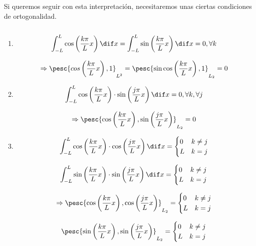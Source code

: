 		Si queremos seguir con esta interpretación, necesitaremos unas ciertas condiciones de ortogonalidad.

		\begin{theorem} $ $ %

			\begin{enumerate}[label=(\arabic*)]

				\item
				\[ \int^{L}_{-L} \cos \left( \frac{k \pi}{L} x \right) \dif x = \int^{L}_{-L} \sin \left( \frac{k \pi}{L} x \right) \dif x = 0, \forall k \]

				\[\Rightarrow \pesc{cos \left( \frac{k \pi}{L} x \right),1}_{L^2} = \pesc{\sin \cos \left( \frac{k \pi}{L} x \right),1}_{L_2} = 0\]

				\item
				\[ \int^{L}_{-L} \cos \left( \frac{k \pi}{L} x \right) \cdot \sin \left( \frac{j \pi}{L} x \right) \dif x = 0, \forall k, \forall j\]

				\[\Rightarrow \pesc{\cos \left( \frac{k \pi}{L} x \right), \sin \left( \frac{j \pi}{L} x \right) }_{L_2} = 0   \]

				\item
				\[ \int^{L}_{-L} \cos \left( \frac{k \pi}{L} x \right) \cdot \cos \left( \frac{j \pi}{L} x \right) \dif x = \begin{cases}
				0 & k \neq j \\
				L & k = j \end{cases} \]

				\[ \int^{L}_{-L} \sin \left( \frac{k \pi}{L} x \right) \cdot \sin \left( \frac{j \pi}{L} x \right) \dif x = \begin{cases}
				0 & k \neq j \\
				L & k = j \end{cases} \]

				\[\Rightarrow \pesc{\cos \left( \frac{k \pi}{L} x \right), \cos \left( \frac{j \pi}{L} x \right) }_{L_2} = \begin{cases}
				0 & k \neq j \\
				L & k = j \end{cases} \]

				\[ \pesc{\sin \left( \frac{k \pi}{L} x \right), \sin \left( \frac{j \pi}{L} x \right) }_{L_2} = \begin{cases}
				0 & k \neq j \\
				L & k = j \end{cases} \]

			\end{enumerate}
		\end{theorem}

